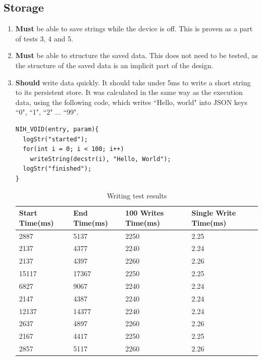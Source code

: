 \documentclass{article}
\begin{document}
\subsection{Storage}
\begin{enumerate}
\item \textbf{Must} be able to save strings while the device is off. This is proven as a part of tests 3, 4 and 5.
\item \textbf{Must} be able to structure the saved data. This does not need to be tested, as the structure of the saved data is an implicit part of the design.
\item \textbf{Should} write data quickly. It should take under 5ms to write a short string to its persistent store. It was calculated in the same way as the execution data, using the following code, which writes ``Hello, world" into JSON keys ``0", ``1", ``2" ... ``99".

\begin{tcolorbox}[colback=white,grow to left by=2.5mm,grow to right by=2.5mm,left*=0mm,right*=0mm,sharp corners]
\begin{verbatim}
NIH_VOID(entry, param){
  logStr("started");
  for(int i = 0; i < 100; i++)
    writeString(decstr(i), "Hello, World");
  logStr("finished");
}
\end{verbatim}
\end{tcolorbox}

\begin{table}[H]
\begin{tabular}{|l|l|l|l|}
\hline
Start Time(ms)		&End Time(ms)				&100 Writes Time(ms)		&Single Write Time(ms)		\\ \hline
2887	 & 5137	 & 2250	 & 2.25\\ \hline
2137	 & 4377	 & 2240	 & 2.24\\ \hline
2137	 & 4397	 & 2260	 & 2.26\\ \hline
15117	 & 17367	 & 2250	 & 2.25\\ \hline
6827	 & 9067	 & 2240	 & 2.24\\ \hline
2147	 & 4387	 & 2240	 & 2.24\\ \hline
12137	 & 14377	 & 2240	 & 2.24\\ \hline
2637	 & 4897	 & 2260	 & 2.26\\ \hline
2167	 & 4417	 & 2250	 & 2.25\\ \hline
2857	 & 5117	 & 2260	 & 2.26\\ \hline
\end{tabular}
\caption{Writing test results}
\end{table}


\end{enumerate}
\end{document}
